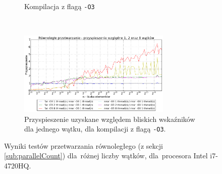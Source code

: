 \begin{figure}
\begin{subfigure}[c]{0.45\textwidth}
        \caption{Kompilacja z flagą \texttt{-O3}}
    \end{subfigure}
    \\
    \vspace{0.2cm}
    \begin{subfigure}[c]{1.0\textwidth}
        \centering
        \includegraphics[width=0.80\textwidth]{images/benchs/parallel_count_normalized}
        \caption{Przyspieszenie uzyskane względem bliskich wskaźników dla jednego wątku, dla kompilacji z flagą \texttt{-O3}.}
        \label{fig:parallelCount12Relative}
    \end{subfigure}
    \caption{Wyniki testów przetwarzania równoległego (z sekcji \ref{sub:parallelCount}) dla~różnej liczby wątków, dla~procesora Intel i7-4720HQ.}
    \label{fig:parallelCount12}
\end{figure}

\clearpage

